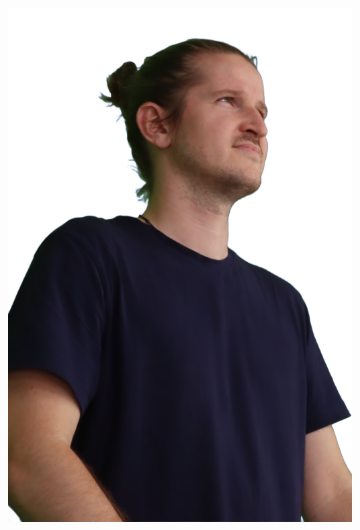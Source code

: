 \begin{figure}[!ht]
\begin{subfigure}{0.12\linewidth}
        \includegraphics[width=\textwidth]{Figures/results/initials/ephra/21_render.png}

\end{subfigure}
\end{figure}
